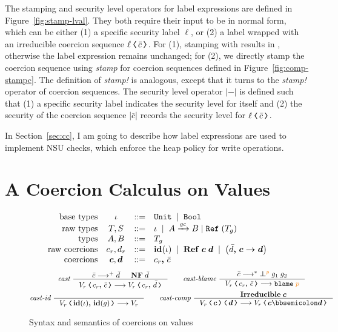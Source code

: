 The stamping and security level operators for label expressions are defined in
Figure~\ref{fig:stamp-lval}. They both require their input to be in normal form,
which can be either (1) a specific security label $\ell$, or (2) a label wrapped
with an irreducible coercion sequence $\cccast{\ell}{\bar{c}}$. For (1),
stamping \low with \high results in \cccast{\low}{\up}, otherwise the label
expression remains unchanged; for (2), we directly stamp the coercion sequence
using \textit{stamp} for coercion sequences defined in
Figure~\ref{fig:comp-stampc}. The definition of \textit{stamp!} is analogous,
except that it turns to the \textit{stamp!} operator of coercion sequences. The
security level operator $|{-}|$ is defined such that (1) a specific security
label indicates the security level for itself and (2) the security of the
coercion sequence $|\bar{c}|$ records the security level for
$\cccast{\ell}{\bar{c}}$.

In Section~\ref{sec:cc}, I am going to describe how label expressions are used
to implement NSU checks, which enforce the heap policy for write operations.

\section{A Coercion Calculus on Values}
\label{sec:coercion-calc-values}

\begin{figure}[tbp]
\raggedright
  \[
  \begin{array}{rcll}
    \text{base types}               & \iota     & ::= & \mathtt{Unit} \;\mid\; \mathtt{Bool} \\
    \text{raw types}                & T, S      & ::= & \iota \;\mid\; {A}\xrightarrow{{\mathit{gc}}}{B} \mid \mathtt{Ref}\;{(T_g)} \\
    \text{types}                    & A, B      & ::= & T_g \\
    \text{raw coercions}            & c_r, d_r  & ::=  & \mathit{\mathbf{id}}(\iota) \;\mid\; \mathbf{Ref}\;{\bm{c}}\;{\bm{d}} \;\mid\; \left( {\bar{d}}\boldsymbol{,}\,{\bm{c}}\boldsymbol{\rightarrow}{\bm{d}} \right) \\
    \text{coercions}                & \bm{c}, \bm{d} & ::= & {c_r}\boldsymbol{,}\,{\bar{c}}
  \end{array}
  \]
  { \small
  \begin{gather*}
  \textit{cast}~
  \inference{\bar{c} \longrightarrow^{+} \bar{d} & \mathbf{NF} \; \bar{d}}
  {\cccast{V_r}{\coerc{c_r}{\bar{c}}} \longrightarrow \cccast{V_r}{\coerc{c_r}{\bar{d}}}}
  \qquad
  \textit{cast-blame}~
  \inference{\bar{c} \longrightarrow^{*} \err{g_1}{g_2}{p}}
  {\cccast{V_r}{\coerc{c_r}{\bar{c}}} \longrightarrow \blame{p}}
  \\
  \textit{cast-id}~
  \inference{}{\cccast{V_r}{\coerc{\id{\iota}}{\id{g}}} \longrightarrow V_r}
  \qquad
  \textit{cast-comp}~
  \inference{\mathbf{Irreducible} \; \bm{c}}
  {\cccast{\cccast{V_r}{\bm{c}}}{\bm{d}} \longrightarrow \cccast{V_r}{\bm{c} \mdoubleplus \bm{d}}}
  \end{gather*}}
  \caption{Syntax and semantics of coercions on values}
  \label{fig:coercions}
\end{figure}

